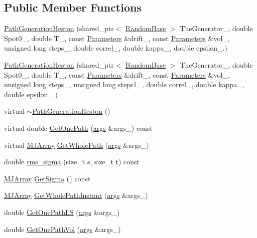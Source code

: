 \subsection*{Public Member Functions}
\begin{DoxyCompactItemize}
\item 
\hyperlink{classPathGenerationHeston_a0a5d87404d3ad4316ae0da262c77112a}{Path\+Generation\+Heston} (shared\+\_\+ptr$<$ \hyperlink{classRandomBase}{Random\+Base} $>$ The\+Generator\+\_\+, double Spot0\+\_\+, double T\+\_\+, const \hyperlink{classParameters}{Parameters} \&drift\+\_\+, const \hyperlink{classParameters}{Parameters} \&vol\+\_\+, unsigned long steps\+\_\+, double correl\+\_\+, double kappa\+\_\+, double epsilon\+\_.)
\item 
\hyperlink{classPathGenerationHeston_af108753ddab26252b6a8a11c1b7e60c6}{Path\+Generation\+Heston} (shared\+\_\+ptr$<$ \hyperlink{classRandomBase}{Random\+Base} $>$ The\+Generator\+\_\+, double Spot0\+\_\+, double T\+\_\+, const \hyperlink{classParameters}{Parameters} \&drift\+\_\+, const \hyperlink{classParameters}{Parameters} \&vol\+\_\+, unsigned long steps\+\_\+, unsigned long steps1\+\_\+, double correl\+\_\+, double kappa\+\_\+, double epsilon\+\_.)
\item 
virtual \hyperlink{classPathGenerationHeston_a53aa6464d915516232efa1cb8ae3ef70}{$\sim$\+Path\+Generation\+Heston} ()
\item 
virtual double \hyperlink{classPathGenerationHeston_ab523f2de8838e845405482b714656015}{Get\+One\+Path} (\hyperlink{path__generation_8h_a75c13cde2074f502cc4348c70528572d}{args} \&args\+\_\+) const
\item 
virtual \hyperlink{classMJArray}{M\+J\+Array} \hyperlink{classPathGenerationHeston_a2916170a243c003fb8362c13def63483}{Get\+Whole\+Path} (\hyperlink{path__generation_8h_a75c13cde2074f502cc4348c70528572d}{args} \&args\+\_\+)
\item 
double \hyperlink{classPathGenerationHeston_a9dde14ddfe82fb957404c39998a0738b}{rms\+\_\+sigma} (size\+\_\+t s, size\+\_\+t t) const
\item 
\hyperlink{classMJArray}{M\+J\+Array} \hyperlink{classPathGenerationHeston_a965b1c92fc29da4d74ee457cd9d56cb1}{Get\+Sigma} () const
\item 
\hyperlink{classMJArray}{M\+J\+Array} \hyperlink{classPathGenerationHeston_aa195e4a13dc9d18165e4cf8a5e809e02}{Get\+Whole\+Path\+Instant} (\hyperlink{path__generation_8h_a75c13cde2074f502cc4348c70528572d}{args} \&args\+\_\+)
\item 
double \hyperlink{classPathGenerationHeston_aacbd76b2461e546faf0e3d5bdd9988ab}{Get\+One\+Path\+LS} (\hyperlink{path__generation_8h_a75c13cde2074f502cc4348c70528572d}{args} \&args\+\_\+)
\item 
double \hyperlink{classPathGenerationHeston_ad85097810cfc672f6250e4c8fa39ee75}{Get\+One\+Path\+Vol} (\hyperlink{path__generation_8h_a75c13cde2074f502cc4348c70528572d}{args} \&args\+\_\+)
\end{DoxyCompactItemize}
